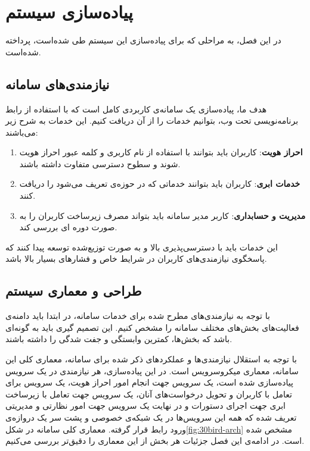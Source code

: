 \chapter{پیاده‌سازی سیستم}
در این فصل، به مراحلی که برای پیاده‌سازی این سیستم طی شده‌است، پرداخته شده‌است.

\section{نیازمندی‌های سامانه}
هدف ما، پیاده‌سازی یک سامانه‌ی کاربردی کامل است که با استفاده از رابط برنامه‌نویسی تحت وب، بتوانیم خدمات را از آن دریافت کنیم. این خدمات به شرح زیر می‌باشند:

\begin{enumerate}
\item \textbf{احراز هویت}: کاربران باید بتوانند با استفاده از نام کاربری و کلمه عبور احراز هویت شوند و سطوح دسترسی متفاوت داشته باشند.

\item \textbf{خدمات ابری}: کاربران باید بتوانند خدماتی که در حوزه‌ی  تعریف می‌شود را دریافت کنند.

\item \textbf{مدیریت و حسابداری}: کاربر مدیر سامانه باید بتواند مصرف زیرساخت‌ کاربران را به صورت دوره ای بررسی کند.
\end{enumerate}

این خدمات باید با دسترسی‌پذیری بالا و به صورت توزیع‌شده توسعه پیدا کنند که پاسخگوی نیازمندی‌های کاربران در شرایط خاص و فشار‌های بسیار بالا باشد.

\section{طراحی و معماری سیستم}
با توجه به نیازمندی‌های مطرح شده برای خدمات سامانه، در ابتدا باید دامنه‌ی فعالیت‌های بخش‌های مختلف سامانه را مشخص کنیم. این تصمیم گیری باید به گونه‌ای باشد که بخش‌ها، کمترین وابستگی و جفت شدگی را داشته باشند.

با توجه به استقلال نیازمندی‌ها و عملکرد‌های ذکر شده برای سامانه، معماری کلی این سامانه، معماری میکروسرویس است. در این پیاده‌سازی، هر نیازمندی در یک سرویس پیاده‌سازی شده است، یک سرویس جهت انجام امور احراز هویت، یک سرویس برای تعامل با کاربران و تحویل درخواست‌های آنان، یک سرویس جهت تعامل با زیرساخت ابری جهت اجرای دستورات و در نهایت یک سرویس جهت امور نظارتی و مدیریتی تعریف شده که همه این سرویس‌ها در یک شبکه‌ی خصوصی و پشت سر یک ‌دروازه‌ی ورود رابط قرار گرفته. معماری کلی سامانه در شکل\ref{fig:30bird-arch} مشخص شده است. در ادامه‌ی این فصل جزئیات هر بخش از این معماری را دقیق‌تر بررسی می‌کنیم.

